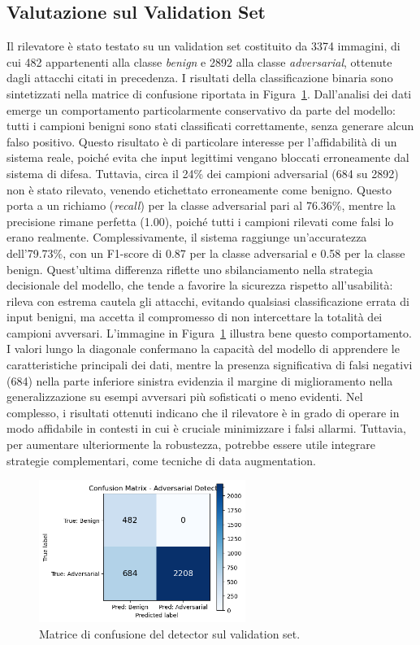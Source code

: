         \subsection{Valutazione sul Validation Set}
            Il rilevatore è stato testato su un validation set costituito da 3374 immagini, di cui 482 appartenenti alla classe \textit{benign} e 2892 alla classe \textit{adversarial}, ottenute dagli attacchi citati in precedenza. I risultati della classificazione binaria sono sintetizzati nella matrice di confusione riportata in Figura~\ref{fig:conf_matrix}.
            Dall’analisi dei dati emerge un comportamento particolarmente conservativo da parte del modello: tutti i campioni benigni sono stati classificati correttamente, senza generare alcun falso positivo. Questo risultato è di particolare interesse per l’affidabilità di un sistema reale, poiché evita che input legittimi vengano bloccati erroneamente dal sistema di difesa. Tuttavia, circa il 24\% dei campioni adversarial (684 su 2892) non è stato rilevato, venendo etichettato erroneamente come benigno. Questo porta a un richiamo (\textit{recall}) per la classe adversarial pari al 76.36\%, mentre la precisione rimane perfetta (1.00), poiché tutti i campioni rilevati come falsi lo erano realmente.
            Complessivamente, il sistema raggiunge un’accuratezza dell’79.73\%, con un F1-score di 0.87 per la classe adversarial e 0.58 per la classe benign. Quest’ultima differenza riflette uno sbilanciamento nella strategia decisionale del modello, che tende a favorire la sicurezza rispetto all’usabilità: rileva con estrema cautela gli attacchi, evitando qualsiasi classificazione errata di input benigni, ma accetta il compromesso di non intercettare la totalità dei campioni avversari.
            L’immagine in Figura~\ref{fig:conf_matrix} illustra bene questo comportamento. I valori lungo la diagonale confermano la capacità del modello di apprendere le caratteristiche principali dei dati, mentre la presenza significativa di falsi negativi (684) nella parte inferiore sinistra evidenzia il margine di miglioramento nella generalizzazione su esempi avversari più sofisticati o meno evidenti.
            Nel complesso, i risultati ottenuti indicano che il rilevatore è in grado di operare in modo affidabile in contesti in cui è cruciale minimizzare i falsi allarmi. Tuttavia, per aumentare ulteriormente la robustezza, potrebbe essere utile integrare strategie complementari, come tecniche di data augmentation.
    
        \begin{figure}[H]
            \centering
            \includegraphics[width=0.6\textwidth]{images/confusionMatrix.png}
            \caption{Matrice di confusione del detector sul validation set.}
            \label{fig:conf_matrix}
        \end{figure}